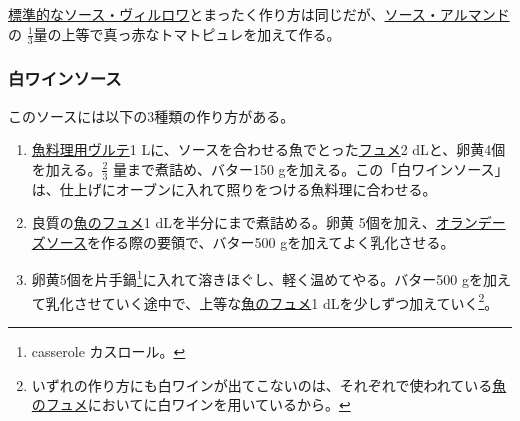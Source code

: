 \begin{recette}
\protect\hyperlink{sauce-villeroy}{標準的なソース・ヴィルロワ}とまったく作り方は同じだが、\protect\hyperlink{sauce-allemande}{ソース・アルマンド}の
\(\frac{1}{3}\)量の上等で真っ赤なトマトピュレを加えて作る。

\hypertarget{sauce-vin-blanc}{%
\subsubsection{白ワインソース}\label{sauce-vin-blanc}}



このソースには以下の3種類の作り方がある。

\begin{enumerate}
\def\labelenumi{\arabic{enumi}.}
\item
  \protect\hyperlink{veloute-de-poisson}{魚料理用ヴルテ}1
  Lに、ソースを合わせる魚でとった\protect\hyperlink{fumet-de-poisson}{フュメ}2
  dLと、卵黄4個を加える。\(\frac{2}{3}\) 量まで煮詰め、バター150
  gを加える。この「白ワインソース」は、仕上げにオーブンに入れて照りをつける魚料理に合わせる。
\item
  良質の\protect\hyperlink{fumet-de-poisson}{魚のフュメ}1
  dLを半分にまで煮詰める。卵黄
  5個を加え、\protect\hyperlink{sauce-hollandaise}{オランデーズソース}を作る際の要領で、バター500
  gを加えてよく乳化させる。
\item
  卵黄5個を片手鍋\footnote{casserole カスロール。}に入れて溶きほぐし、軽く温めてやる。バター500
  gを加えて乳化させていく途中で、上等な\protect\hyperlink{fumet-de-poisson}{魚のフュメ}1
  dLを少しずつ加えていく\footnote{いずれの作り方にも白ワインが出てこないのは、それぞれで使われている\protect\hyperlink{fumet-de-poisson}{魚のフュメ}においてに白ワインを用いているから。}。
\end{enumerate}
\end{recette}